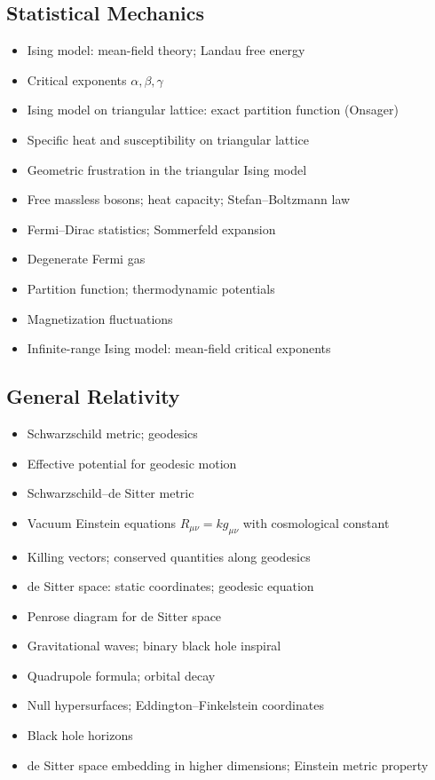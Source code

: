 \documentclass{amsart}
\begin{document}
\subsection{Statistical Mechanics}

\begin{itemize}
  \item Ising model: mean-field theory; Landau free energy
  \item Critical exponents $\alpha, \beta, \gamma$
  \item Ising model on triangular lattice: exact partition function (Onsager)
  \item Specific heat and susceptibility on triangular lattice
  \item Geometric frustration in the triangular Ising model
  \item Free massless bosons; heat capacity; Stefan--Boltzmann law
  \item Fermi--Dirac statistics; Sommerfeld expansion
  \item Degenerate Fermi gas
  \item Partition function; thermodynamic potentials
  \item Magnetization fluctuations
  \item Infinite-range Ising model: mean-field critical exponents
\end{itemize}

\subsection{General Relativity}

\begin{itemize}
  \item Schwarzschild metric; geodesics
  \item Effective potential for geodesic motion
  \item Schwarzschild--de Sitter metric
  \item Vacuum Einstein equations $R_{\mu\nu}=kg_{\mu\nu}$ with cosmological constant
  \item Killing vectors; conserved quantities along geodesics
  \item de Sitter space: static coordinates; geodesic equation
  \item Penrose diagram for de Sitter space
  \item Gravitational waves; binary black hole inspiral
  \item Quadrupole formula; orbital decay
  \item Null hypersurfaces; Eddington--Finkelstein coordinates
  \item Black hole horizons
  \item de Sitter space embedding in higher dimensions; Einstein metric property
\end{itemize}
\end{document}
